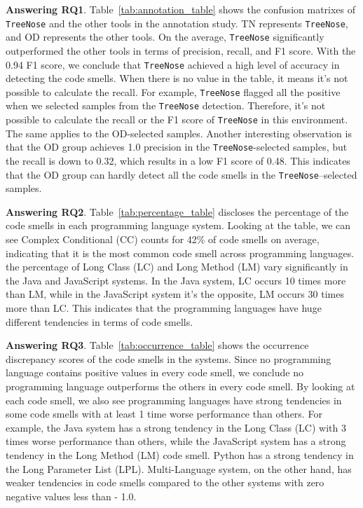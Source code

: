 


{\bf Answering RQ1}. Table~\ref{tab:annotation_table} shows the confusion
matrixes of \texttt{TreeNose} and the other tools in the annotation study. TN
represents \texttt{TreeNose}, and OD represents the other tools. On the
average, \texttt{TreeNose} significantly outperformed the other tools in terms
of precision, recall, and F1 score. With the 0.94 F1 score, we conclude that
\texttt{TreeNose} achieved a high level of accuracy in detecting the code
smells. When there is no value in the table, it means it's not possible to
calculate the recall. For example, \texttt{TreeNose} flagged all the positive
when we selected samples from the \texttt{TreeNose} detection. Therefore, it's
not possible to calculate the recall or the F1 score of \texttt{TreeNose} in
this environment. The same applies to the OD-selected samples. Another
interesting observation is that the OD group achieves 1.0 precision in the
\texttt{TreeNose}-selected samples, but the recall is down to 0.32, which
results in a low F1 score of 0.48. This indicates that the OD group can hardly
detect all the code smells in the \texttt{TreeNose}--selected samples.

{\bf Answering RQ2}. Table~\ref{tab:percentage_table} discloses the percentage
of the code smells in each programming language system. Looking at the table,
we can see Complex Conditional (CC) counts for 42\% of code smells on average,
indicating that it is the most common code smell across programming languages.
the percentage of Long Class (LC) and Long Method (LM) vary significantly in
the Java and JavaScript systems. In the Java system, LC occurs 10 times more
than LM, while in the JavaScript system it's the opposite, LM occurs 30 times
more than LC. This indicates that the programming languages have huge different
tendencies in terms of code smells.

{\bf Answering RQ3}. Table~\ref{tab:occurrence_table} shows the occurrence
discrepancy scores of the code smells in the systems. Since no programming
language contains positive values in every code smell, we conclude no
programming language outperforms the others in every code smell. By looking at
each code smell, we also see programming languages have strong tendencies in
some code smells with at least 1 time worse performance than others. For
example, the Java system has a strong tendency in the Long Class (LC) with 3
times worse performance than others, while the JavaScript system has a strong
tendency in the Long Method (LM) code smell. Python has a strong tendency in
the Long Parameter List (LPL). Multi-Language system, on the other hand, has
weaker tendencies in code smells compared to the other systems with zero
negative values less than - 1.0.
